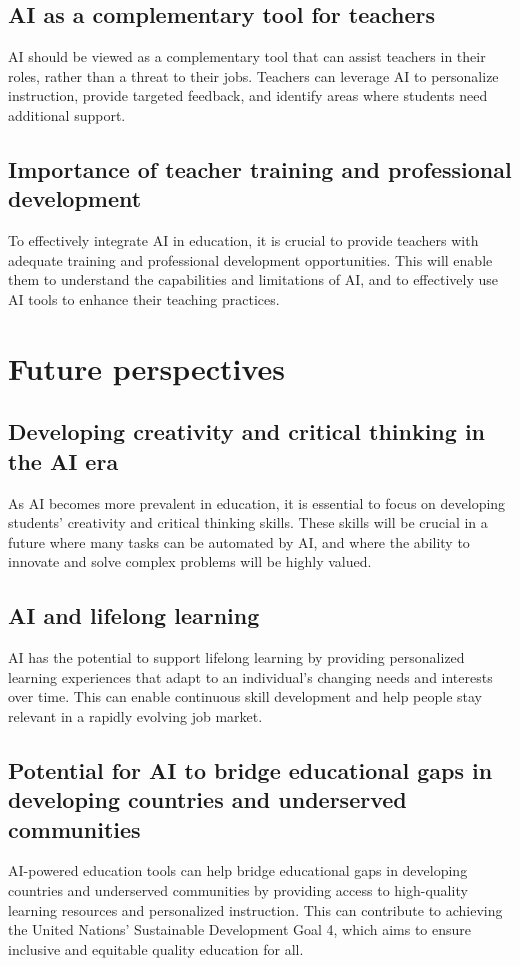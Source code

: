 \documentclass{article}
\begin{document}
\subsection{AI as a complementary tool for teachers}
AI should be viewed as a complementary tool that can assist teachers in their roles, rather than a threat to their jobs. Teachers can leverage AI to personalize instruction, provide targeted feedback, and identify areas where students need additional support.

\subsection{Importance of teacher training and professional development}
To effectively integrate AI in education, it is crucial to provide teachers with adequate training and professional development opportunities. This will enable them to understand the capabilities and limitations of AI, and to effectively use AI tools to enhance their teaching practices.

\newpage
\section{Future perspectives}

\subsection{Developing creativity and critical thinking in the AI era}
As AI becomes more prevalent in education, it is essential to focus on developing students' creativity and critical thinking skills. These skills will be crucial in a future where many tasks can be automated by AI, and where the ability to innovate and solve complex problems will be highly valued.

\subsection{AI and lifelong learning}
AI has the potential to support lifelong learning by providing personalized learning experiences that adapt to an individual's changing needs and interests over time. This can enable continuous skill development and help people stay relevant in a rapidly evolving job market.

\subsection{Potential for AI to bridge educational gaps in developing countries and underserved communities}
AI-powered education tools can help bridge educational gaps in developing countries and underserved communities by providing access to high-quality learning resources and personalized instruction. This can contribute to achieving the United Nations' Sustainable Development Goal 4, which aims to ensure inclusive and equitable quality education for all.
\end{document}

